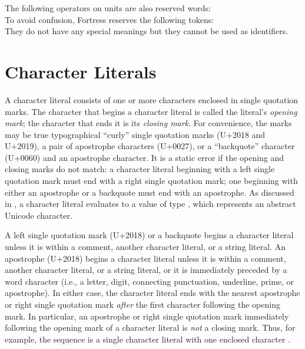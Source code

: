 The following operators on units are also reserved words:\\


To avoid confusion, Fortress reserves the following tokens:\\


They do not have any special meanings but they cannot be used as
identifiers.



\section{Character Literals}

A character literal consists of
one or more characters enclosed in single quotation marks.
The character that begins a character literal
is called the literal's \emph{opening mark};
the character that ends it is its \emph{closing mark}.
For convenience,
the marks may be true typographical ``curly'' single quotation marks
(U+2018 and U+2019),
a pair of apostrophe characters (U+0027),
or a ``backquote'' character (U+0060) and an apostrophe character.
It is a static error if the opening and closing marks do not match:
a character literal beginning with a left single quotation mark
must end with a right single quotation mark;
one beginning with either an apostrophe or a backquote
must end with an apostrophe.
As discussed in ,
a character literal evaluates to a value of type ,
which represents an abstract Unicode character.

A left single quotation mark (U+2018) or a backquote
begins a character literal
unless it is within a comment, another character literal,
or a string literal.
An apostrophe (U+2018)
begins a character literal
unless it is within a comment, another character literal,
or a string literal,
or it is immediately preceded by a word character
(i.e., a letter, digit, connecting punctuation,
underline, prime, or apostrophe).
In either case,
the character literal ends
with the nearest apostrophe or right single quotation mark
\emph{after} the first character following the opening mark.
In particular,
an apostrophe or right single quotation mark
immediately following the opening mark of a character literal
is \emph{not} a closing mark.
Thus,
for example,
the sequence  is a single character literal
with one enclosed character .

